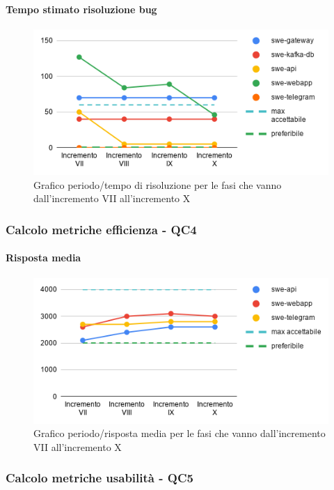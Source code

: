 \paragraph{Tempo stimato risoluzione bug}
\begin{figure}[H]
			\centering
			\includegraphics[width=0.8\linewidth]{./res/images/QM-PROD-7-TBUG.png}
			\caption{Grafico periodo/tempo di risoluzione per le fasi che vanno dall'incremento VII all'incremento X}
			\label{fig:Grafico periodo/tempo di risoluzione per le fasi che vanno dall'incremento VII all'incremento X}
	\end{figure}

\subsubsection{Calcolo metriche efficienza - QC4}
\paragraph{Risposta media}
\begin{figure}[H]
			\centering
			\includegraphics[width=0.8\linewidth]{./res/images/QM-PROD-8-RM.png}
			\caption{Grafico periodo/risposta media per le fasi che vanno dall'incremento VII all'incremento X}
			\label{fig:Grafico periodo/risposta media per le fasi che vanno dall'incremento VII all'incremento X}
	\end{figure}

\subsubsection{Calcolo metriche usabilità - QC5}
